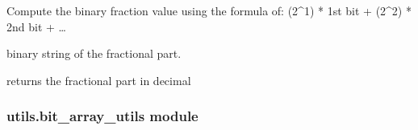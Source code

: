 \documentclass[letterpaper,10pt,english]{sphinxmanual}
\begin{document}
\begin{fulllineitems}
\label{\detokenize{utils:utils.ac_utils.getBinaryFractionValue}}
\pysigstartsignatures
{}
\pysigstopsignatures
\sphinxAtStartPar
Compute the binary fraction value using the formula of:
(2\textasciicircum{}\sphinxhyphen{}1) * 1st bit + (2\textasciicircum{}\sphinxhyphen{}2) * 2nd bit + …
\begin{description}
\begin{description}
\sphinxAtStartPar
binary string of the fractional part.

\end{description}

\begin{description}
\sphinxAtStartPar
returns the fractional part in decimal

\end{description}

\end{description}

\end{fulllineitems}



\subsubsection{utils.bit\_array\_utils module}
\label{\detokenize{utils:module-utils.bit_array_utils}}\label{\detokenize{utils:utils-bit-array-utils-module}}
\end{document}
